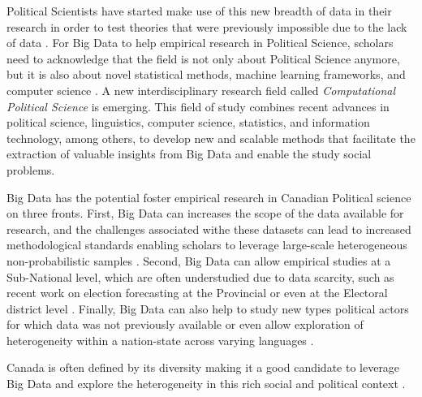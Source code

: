 \documentclass{article}
\begin{document}
Political Scientists have started make use of this new breadth of data in their research in order to test theories that were previously impossible due to the lack of data \citet{rheault2019word, temporao2018ideological}.
For Big Data to help empirical research in Political Science, scholars need to acknowledge that the field is not only about Political Science anymore, but it is also about novel statistical methods, machine learning frameworks, and computer science \citep{grimmer2015we}.
A new interdisciplinary research field called \textit{Computational Political Science} is emerging.
This field of study combines recent advances in political science, linguistics, computer science, statistics, and information technology, among others, to develop new and scalable methods that facilitate the extraction of valuable insights from Big Data and enable the study social problems.

Big Data has the potential foster empirical research in Canadian Political science on three fronts.
First, Big Data can increases the scope of the data available for research, and the challenges associated withe these datasets can lead to increased methodological standards enabling scholars to leverage large-scale heterogeneous non-probabilistic samples \citep{ruths2014social, shiffrin2016drawing}. Second, Big Data can allow empirical studies at a Sub-National level, which are often understudied due to data scarcity, such as recent work on election forecasting at the Provincial or even at the Electoral district level \citet{temporao2019crowdsourcing}.
Finally, Big Data can also help to study new types political actors for which data was not previously available or even allow exploration of heterogeneity within a nation-state across varying languages \citep{temporao2018ideological, dufresne2018symbolic, rheault2019word}.

Canada is often defined by its diversity making it a good candidate to leverage Big Data and explore the heterogeneity in this rich social and political context \citep{dufresne2018symbolic}.

\newpage


\end{document}
